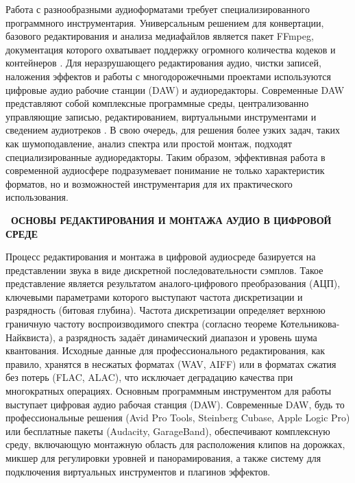 \documentclass{SibFU-docs}
\begin{document}
Работа с разнообразными аудиоформатами требует специализированного программного инструментария. Универсальным решением для конвертации, базового редактирования и анализа медиафайлов является пакет FFmpeg, документация которого охватывает поддержку огромного количества кодеков и контейнеров \cite{ffmpeg_doc}. Для неразрушающего редактирования аудио, чистки записей, наложения эффектов и работы с многодорожечными проектами используются цифровые аудио рабочие станции (DAW) и аудиоредакторы. Современные DAW представляют собой комплексные программные среды, централизованно управляющие записью, редактированием, виртуальными инструментами и сведением аудиотреков \cite{daw_wikipedia}. В свою очередь, для решения более узких задач, таких как шумоподавление, анализ спектра или простой монтаж, подходят специализированные аудиоредакторы. Таким образом, эффективная работа в современной аудиосфере подразумевает понимание не только характеристик форматов, но и возможностей инструментария для их практического использования.

\newpage
{}
\begin{center}\textbf{\thesection\ ОСНОВЫ РЕДАКТИРОВАНИЯ И МОНТАЖА АУДИО В ЦИФРОВОЙ СРЕДЕ}\end{center}
\vspace*{-1.5em}

Процесс редактирования и монтажа в цифровой аудиосреде базируется на представлении звука в виде дискретной последовательности сэмплов. Такое представление является результатом аналого-цифрового преобразования (АЦП), ключевыми параметрами которого выступают частота дискретизации и разрядность (битовая глубина). Частота дискретизации определяет верхнюю граничную частоту воспроизводимого спектра (согласно теореме Котельникова-Найквиста), а разрядность задаёт динамический диапазон и уровень шума квантования. Исходные данные для профессионального редактирования, как правило, хранятся в несжатых форматах (WAV, AIFF) или в форматах сжатия без потерь (FLAC, ALAC), что исключает деградацию качества при многократных операциях. Основным программным инструментом для работы выступает цифровая аудио рабочая станция (DAW). Современные DAW, будь то профессиональные решения (Avid Pro Tools, Steinberg Cubase, Apple Logic Pro) или бесплатные пакеты (Audacity, GarageBand), обеспечивают комплексную среду, включающую монтажную область для расположения клипов на дорожках, микшер для регулировки уровней и панорамирования, а также систему для подключения виртуальных инструментов и плагинов эффектов.
\end{document}
